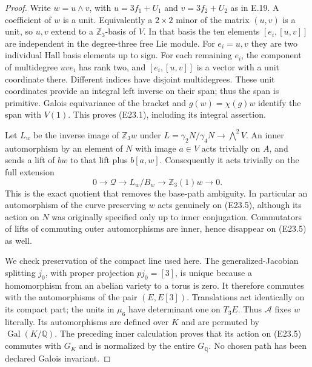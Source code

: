 \begin{proof}
Write $w=u\wedge v$, with
$u=3f_1+U_1$ and $v=3f_2+U_2$ as in E.19. A coefficient
of $w$ is a unit. Equivalently a $2\times2$ minor of the
matrix $(u,v)$ is a unit, so $u,v$ extend to a
$\mathbb Z_3$-basis of $V$. In that basis the ten elements
$[e_i,[u,v]]$ are independent in the degree-three free Lie
module. For $e_i=u,v$ they are two individual Hall basis
elements up to sign. For each remaining $e_i$, the component
of multidegree $u v e_i$ has rank two, and
$[e_i,[u,v]]$ is a vector with a unit coordinate there.
Different indices have disjoint multidegrees. These unit
coordinates provide an integral left inverse on their span;
thus the span is primitive. Galois equivariance of the bracket
and $g(w)=\chi(g)w$ identify the span with $V(1)$.
This proves (E23.1), including its integral assertion.

Let $L_w$ be the inverse image of $\mathbb Z_3w$ under
$L=\gamma_2N/\gamma_4N\to\bigwedge^2V$.
An inner automorphism by an element of $N$ with image
$a\in V$ acts trivially on $A$, and sends a lift of
$b w$ to that lift plus $b[a,w]$. Consequently it acts
trivially on the full extension
\[
 0\longrightarrow\mathcal Q\longrightarrow
 L_w/B_w\longrightarrow\mathbb Z_3(1)w
             \longrightarrow0.
 \tag{E23.5}
\]
This is the exact quotient that removes the base-path
ambiguity. In particular an automorphism of the curve
preserving $w$ acts genuinely on (E23.5), although its
action on $N$ was originally specified only up to inner
conjugation. Commutators of lifts of commuting outer
automorphisms are inner, hence disappear on (E23.5) as well.

We check preservation of the compact line used here.
The generalized-Jacobian splitting $j_0$, with proper
projection $p j_0=[3]$, is unique because a homomorphism
from an abelian variety to a torus is zero. It therefore
commutes with the automorphisms of the pair $(E,E[3])$.
Translations act identically on its compact part; the
units in $\mu_6$ have determinant one on $T_3E$.
Thus $\mathcal A$ fixes $w$ literally. Its automorphisms
are defined over $K$ and are permuted by
$\operatorname{Gal}(K/\mathbb Q)$. The preceding inner
calculation proves that its action on (E23.5) commutes
with $G_K$ and is normalized by the entire $G_{\mathbb Q}$.
No chosen path has been declared Galois invariant.


\end{proof}
